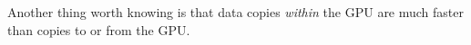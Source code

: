 \documentclass[12pt]{article}
\begin{document}





Another thing worth knowing is that data copies {\it within} the GPU are much faster than copies to or from the GPU.






\end{document}
